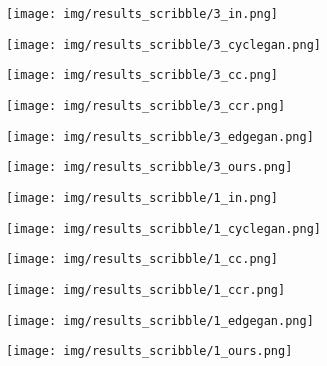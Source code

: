 \documentclass[10pt,twocolumn,letterpaper]{article}
\begin{document}
\newcommand{\scribblewidth}{0.15} 
\begin{figure}[tbp]
\captionsetup[subfigure]{labelformat=empty}
\begin{center}
  \begin{subfigure}[b]{\scribblewidth\linewidth}
  \texttt{[image: img/results\_scribble/3\_in.png]}
  \end{subfigure}
  \begin{subfigure}[b]{\scribblewidth\linewidth}
  \texttt{[image: img/results\_scribble/3\_cyclegan.png]}
  \end{subfigure}
   \begin{subfigure}[b]{\scribblewidth\linewidth}
  \texttt{[image: img/results\_scribble/3\_cc.png]}
  \end{subfigure}
   \begin{subfigure}[b]{\scribblewidth\linewidth}
  \texttt{[image: img/results\_scribble/3\_ccr.png]}
  \end{subfigure}
 \begin{subfigure}[b]{\scribblewidth\linewidth}
  \texttt{[image: img/results\_scribble/3\_edgegan.png]}
  \end{subfigure}
  \begin{subfigure}[b]{\scribblewidth\linewidth}
  \texttt{[image: img/results\_scribble/3\_ours.png]}
  \end{subfigure}
  
  \begin{subfigure}[b]{\scribblewidth\linewidth}
  \texttt{[image: img/results\_scribble/1\_in.png]}
  \end{subfigure}
  \begin{subfigure}[b]{\scribblewidth\linewidth}
  \texttt{[image: img/results\_scribble/1\_cyclegan.png]}
  \end{subfigure}
   \begin{subfigure}[b]{\scribblewidth\linewidth}
  \texttt{[image: img/results\_scribble/1\_cc.png]}
  \end{subfigure}
   \begin{subfigure}[b]{\scribblewidth\linewidth}
  \texttt{[image: img/results\_scribble/1\_ccr.png]}
  \end{subfigure}
 \begin{subfigure}[b]{\scribblewidth\linewidth}
  \texttt{[image: img/results\_scribble/1\_edgegan.png]}
  \end{subfigure}
  \begin{subfigure}[b]{\scribblewidth\linewidth}
  \texttt{[image: img/results\_scribble/1\_ours.png]}
  \end{subfigure}
  

\end{center}
\end{figure}
\end{document}
